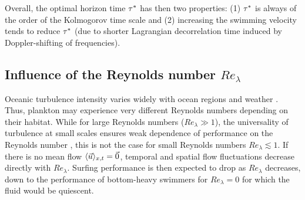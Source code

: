 Overall, the optimal horizon time $\tau^*$ has then two properties: (1) $\tau^*$ is always of the order of the Kolmogorov time scale and (2) increasing the swimming velocity tends to reduce $\tau^*$ (due to shorter Lagrangian decorrelation time induced by Doppler-shifting of frequencies).

\subsection{Influence of the Reynolds number $\mathit{Re}_{\lambda}$}

Oceanic turbulence intensity varies widely with ocean regions and weather \citep{fuchs2016seascape}.
Thus, plankton may experience very different Reynolds numbers depending on their habitat.
While for large Reynolds numbers ($\mathit{Re}_{\lambda} \gg 1$), the universality of turbulence at small scales ensures weak dependence of performance on the Reynolds number \citep{frisch1995turbulence}, this is not the case for small Reynolds numbers $\mathit{Re}_{\lambda} \lesssim 1$.
If there is no mean flow $\langle \vec{u} \rangle_{x,t} = \vec{0}$, temporal and spatial flow fluctuations decrease directly with $\mathit{Re}_{\lambda}$. 
Surfing performance is then expected to drop as $\mathit{Re}_{\lambda}$ decreases, down to the performance of bottom-heavy swimmers for $\mathit{Re}_{\lambda} = 0$ for which the fluid would be quiescent.

